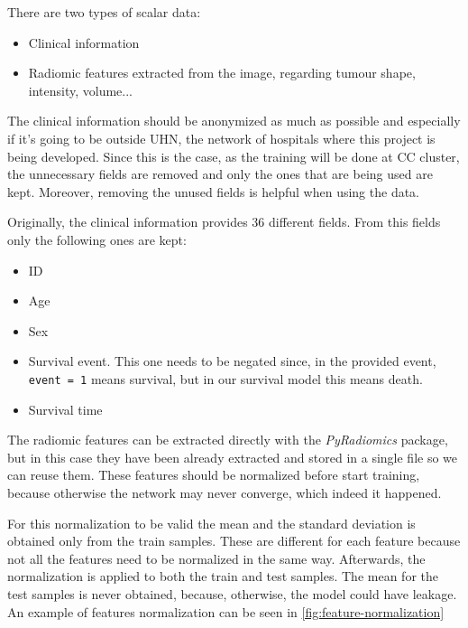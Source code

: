 
There are two types of scalar data:
\begin{itemize}
  \item Clinical information
  \item Radiomic features extracted from the image, regarding tumour shape, intensity, volume...
\end{itemize}

The clinical information should be anonymized as much as possible and especially if it's going
to be outside \gls{UHN}, the network of hospitals where this project is being developed.
Since this is the case, as the training will be done at \gls{CC} cluster, the unnecessary fields
are removed and only the ones that are being used are kept. Moreover, removing the unused fields
is helpful when using the data.

Originally, the clinical information provides 36 different fields. From this fields only the 
following ones are kept:
\begin{itemize}
  \item ID
  \item Age
  \item Sex
  \item Survival event. This one needs to be negated since, in the provided event, \verb|event = 1|
        means survival, but in our survival model this means death. 
  \item Survival time
\end{itemize}

The radiomic features can be extracted directly with the \emph{PyRadiomics}
\cite{medical:py-radiomics} package, but in this case they have been already extracted and stored
in a single file so we can reuse them. These features should be normalized before start training,
because otherwise the network may never converge, which indeed it happened. 

For this normalization to be valid the mean and the standard deviation is obtained only from 
the train samples. These are different for each feature because not all the features need to 
be normalized in the same way. Afterwards, the normalization is applied to both the train 
and test samples. The mean for the test samples is never obtained, because, otherwise, the
model could have \gls{leakage}. An example of features normalization can be seen in
\autoref{fig:feature-normalization}

